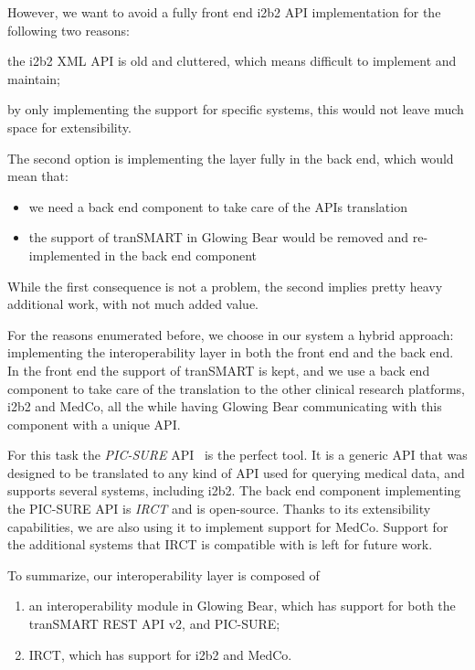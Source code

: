 However, we want to avoid a fully front end i2b2 API implementation for the following two reasons: 
\begin{enumerate*}
    \item the i2b2 XML API is old and cluttered, which means difficult to implement and maintain;
    \item by only implementing the support for specific systems, this would not leave much space for extensibility.
\end{enumerate*}

\begin{samepage}
The second option is implementing the layer fully in the back end, which would mean that:
\begin{itemize}
    \item we need a back end component to take care of the APIs translation
    \item the support of tranSMART in Glowing Bear would be removed and re-implemented in the back end component
\end{itemize}
While the first consequence is not a problem, the second implies pretty heavy additional work, with not much added value.
\end{samepage}


For the reasons enumerated before, we choose in our system a hybrid approach: implementing the interoperability layer in both the front end and the back end.
In the front end the support of tranSMART is kept, and we use a back end component to take care of the translation to the other clinical research platforms, i2b2 and MedCo, all the while having Glowing Bear communicating with this component with a unique API.

For this task the \emph{PIC-SURE} API~\cite{PIC-SURE-API} is the perfect tool.
It is a generic API that was designed to be translated to any kind of API used for querying medical data, and supports several systems, including i2b2.
The back end component implementing the PIC-SURE API is \emph{IRCT} and is open-source.
Thanks to its extensibility capabilities, we are also using it to implement support for MedCo.
Support for the additional systems that IRCT is compatible with is left for future work.

To summarize, our interoperability layer is composed of 
\begin{enumerate}
    \item an interoperability module in  Glowing Bear, which has support for both the tranSMART REST API v2, and PIC-SURE;
    \item IRCT, which has support for i2b2 and MedCo.
\end{enumerate} 


